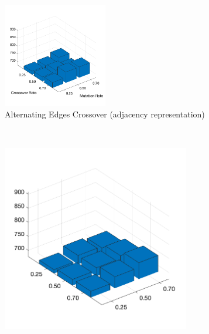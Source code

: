 
\begin{figure}[H]
	\centering
%
	\begin{subfigure}[b]{0.7\textwidth}
		\centering
		\includegraphics[width=0.5\textwidth]{crossover/min/cross_alt_edges_1.png}
		\caption{Alternating Edges Crossover (adjacency representation)}
		\label{fig:z}
    	\end{subfigure}\\
%
	\begin{subfigure}[b]{0.25\textwidth}
		\centering
		\includegraphics[width=0.9\textwidth]{crossover/min/cross_cycle_1.png}

\end{subfigure}
\end{figure}
